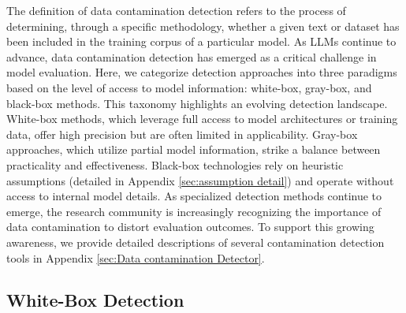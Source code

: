 \label{sec:how}


The definition of data contamination detection refers to the process of determining, through a specific methodology, whether a given text or dataset has been included in the training corpus of a particular model. As LLMs continue to advance, data contamination detection has emerged as a critical challenge in model evaluation. Here, we categorize detection approaches into three paradigms based on the level of access to model information: white-box, gray-box, and black-box methods. This taxonomy highlights an evolving detection landscape. White-box methods, which leverage full access to model architectures or training data, offer high precision but are often limited in applicability. Gray-box approaches, which utilize partial model information, strike a balance between practicality and effectiveness. Black-box technologies rely on heuristic assumptions (detailed in Appendix \ref{sec:assumption detail}) and operate without access to internal model details. As specialized detection methods continue to emerge, the research community is increasingly recognizing the importance of data contamination to distort evaluation outcomes. To support this growing awareness, we provide detailed descriptions of several contamination detection tools in Appendix \ref{sec:Data contamination Detector}.

\subsection{White-Box Detection}


